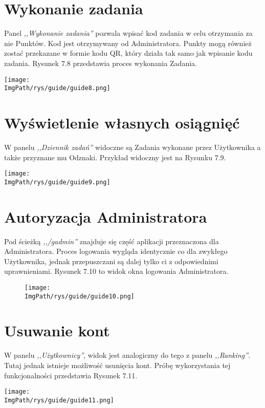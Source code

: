 \documentclass[a4paper,12pt,twoside,openany]{report}
\newcommand{\ImgPath}{.}
\begin{document}
\section{Wykonanie zadania}
Panel \textit{,,Wykonanie zadania''} pozwala wpisać kod zadania w celu otrzymania za nie Punktów. Kod jest otrzymywany od Administratora. Punkty mogą również zostać przekazane w formie kodu QR, który działa tak samo jak wpisanie kodu zadania. Rysunek 7.8 przedstawia proces wykonania Zadania.
								\begin{sidewaysfigure}[!htbp]
									\begin{center}
										\centering
										\texttt{[image: \\ImgPath/rys/guide/guide8.png]}
									\end{center}
									\caption{}
									\label{UMLTS}
								\end{sidewaysfigure}
\section{Wyświetlenie własnych osiągnięć}
W panelu \textit{,,Dziennik zadań''} widoczne są Zadania wykonane przez Użytkownika a także przyznane mu Odznaki. Przykład widoczny jest na Rysunku 7.9.
								\begin{sidewaysfigure}[!htbp]
									\begin{center}
										\centering
										\texttt{[image: \\ImgPath/rys/guide/guide9.png]}
									\end{center}
									\caption{}
									\label{UMLTS}
								\end{sidewaysfigure}
\section{Autoryzacja Administratora}
Pod ścieżką \textit{,,/gadmin''} znajduje się część aplikacji przeznaczona dla Administratora. Proces logowania wygląda identycznie co dla zwykłego Użytkownika, jednak przepuszczani są dalej tylko ci z odpowiednimi uprawnieniami. Rysunek 7.10 to widok okna logowania Administratora. 
								\begin{figure}[!htbp]
									\begin{center}
										\centering
										\texttt{[image: \\ImgPath/rys/guide/guide10.png]}
									\end{center}
									\caption{}
									\label{UMLTS}
								\end{figure}
\section{Usuwanie kont}
W panelu \textit{,,Użytkownicy''}, widok jest analogiczny do tego z panelu \textit{,,Ranking''}. Tutaj jednak istnieje możliwość usunięcia kont. Próbę wykorzystania tej funkcjonalności przedstawia Rysunek 7.11.
								\begin{sidewaysfigure}[!htbp]
									\begin{center}
										\centering
										\texttt{[image: \\ImgPath/rys/guide/guide11.png]}
									\end{center}
									\caption{}
									\label{UMLTS}
								\end{sidewaysfigure}
\end{document}
